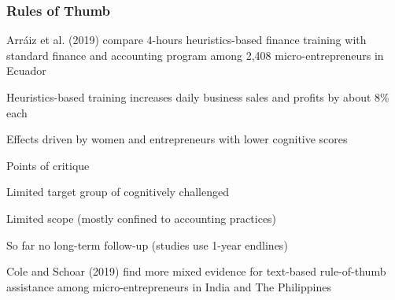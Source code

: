 \documentclass[hideothersubsections, usenames,dvipsnames,11pt]{beamer}
\newenvironment{itemize_2pt}{\itemize\addtolength{\itemsep}{2pt}}{\enditemize}
\begin{document}
\begin{frame}
\frametitle{Rules of Thumb}
	\begin{itemize_2pt}
		\item \textcolor{camel}{Arr\'aiz et al. (2019)} compare 4-hours heuristics-based finance training with standard finance and accounting program among 2,408 micro-entrepreneurs in Ecuador 
		\begin{itemize_2pt}
			\item Heuristics-based training increases daily business sales and profits by about 8\% each
			\item Effects driven by \textcolor{bdf}{women} and entrepreneurs with \textcolor{bdf}{lower cognitive scores}
		\end{itemize_2pt}
		
		\vspace{1.0em}
		
		\item Points of critique
		\begin{itemize_2pt}
			\item \textcolor{bdf}{Limited target group} of cognitively challenged
			\item \textcolor{bdf}{Limited scope} (mostly confined to accounting practices)
			\item So far \textcolor{bdf}{no long-term follow-up} (studies use 1-year endlines)
			\item \textcolor{camel}{Cole and Schoar (2019)} find more mixed evidence for text-based rule-of-thumb assistance among micro-entrepreneurs in India and The Philippines
		\end{itemize_2pt}
		
	\end{itemize_2pt}
\end{frame}

%
\end{document}
